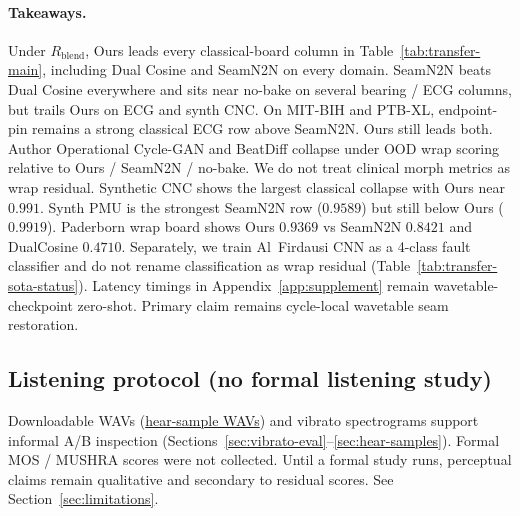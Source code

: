 \paragraph{Takeaways.}
Under $R_{\mathrm{blend}}$, Ours leads every classical-board column in Table~\ref{tab:transfer-main},
including Dual Cosine and SeamN2N on every domain.
SeamN2N beats Dual Cosine everywhere and sits near no-bake on several bearing / ECG columns, but trails Ours
on ECG and synth CNC.
On MIT-BIH and PTB-XL, endpoint-pin remains a strong classical ECG row above SeamN2N. Ours still leads both.
Author Operational Cycle-GAN and BeatDiff collapse under OOD wrap scoring relative to Ours / SeamN2N / no-bake.
We do not treat clinical morph metrics as wrap residual.
Synthetic CNC shows the largest classical collapse with Ours near $0.991$.
Synth PMU is the strongest SeamN2N row ($0.9589$) but still below Ours ($0.9919$).
Paderborn wrap board shows Ours $0.9369$ vs SeamN2N $0.8421$ and DualCosine $0.4710$.
Separately, we train Al~Firdausi CNN as a 4-class fault classifier and do not rename classification as wrap residual
(Table~\ref{tab:transfer-sota-status}).
Latency timings in Appendix~\ref{app:supplement} remain wavetable-checkpoint zero-shot.
Primary claim remains cycle-local wavetable seam restoration.

\subsection{Listening protocol (no formal listening study)}
\label{sec:listening-protocol}

Downloadable WAVs
(\href{https://github.com/reeldemo/reelsynth/tree/main/brand/artifacts/meta_approach_compare/hear_samples}{hear-sample WAVs})
and vibrato spectrograms support informal A/B inspection
(Sections~\ref{sec:vibrato-eval}--\ref{sec:hear-samples}).
Formal MOS / MUSHRA scores were not collected.
Until a formal study runs, perceptual claims remain qualitative and secondary to residual scores.
See Section~\ref{sec:limitations}.
